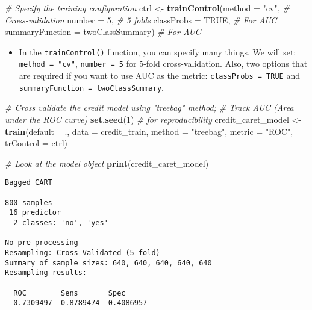 \documentclass[
]{book}
\newenvironment{Shaded}{\begin{snugshade}}{\end{snugshade}}
\newcommand{\CommentTok}[1]{\textcolor[rgb]{0.56,0.35,0.01}{\textit{#1}}}
\newcommand{\DataTypeTok}[1]{\textcolor[rgb]{0.13,0.29,0.53}{#1}}
\newcommand{\DecValTok}[1]{\textcolor[rgb]{0.00,0.00,0.81}{#1}}
\newcommand{\KeywordTok}[1]{\textcolor[rgb]{0.13,0.29,0.53}{\textbf{#1}}}
\newcommand{\NormalTok}[1]{#1}
\newcommand{\OperatorTok}[1]{\textcolor[rgb]{0.81,0.36,0.00}{\textbf{#1}}}
\newcommand{\OtherTok}[1]{\textcolor[rgb]{0.56,0.35,0.01}{#1}}
\newcommand{\StringTok}[1]{\textcolor[rgb]{0.31,0.60,0.02}{#1}}
\providecommand{\tightlist}{%
  \setlength{\itemsep}{0pt}\setlength{\parskip}{0pt}}
\begin{document}
\begin{Shaded}
\begin{Highlighting}[]
\CommentTok{# Specify the training configuration}
\NormalTok{ctrl <-}\StringTok{ }\KeywordTok{trainControl}\NormalTok{(}\DataTypeTok{method =} \StringTok{"cv"}\NormalTok{,     }\CommentTok{# Cross-validation}
                     \DataTypeTok{number =} \DecValTok{5}\NormalTok{,      }\CommentTok{# 5 folds}
                     \DataTypeTok{classProbs =} \OtherTok{TRUE}\NormalTok{,                  }\CommentTok{# For AUC}
                     \DataTypeTok{summaryFunction =}\NormalTok{ twoClassSummary)  }\CommentTok{# For AUC}
\end{Highlighting}
\end{Shaded}

\begin{itemize}
\tightlist
\item
  In the \texttt{trainControl()} function, you can specify many things. We will set: \texttt{method\ =\ "cv"}, \texttt{number\ =\ 5} for 5-fold cross-validation. Also, two options that are required if you want to use AUC as the metric: \texttt{classProbs\ =\ TRUE} and \texttt{summaryFunction\ =\ twoClassSummary}.
\end{itemize}

\begin{Shaded}
\begin{Highlighting}[]
\CommentTok{# Cross validate the credit model using "treebag" method; }
\CommentTok{# Track AUC (Area under the ROC curve)}
\KeywordTok{set.seed}\NormalTok{(}\DecValTok{1}\NormalTok{)  }\CommentTok{# for reproducibility}
\NormalTok{credit_caret_model <-}\StringTok{ }\KeywordTok{train}\NormalTok{(default }\OperatorTok{~}\StringTok{ }\NormalTok{.,}
                            \DataTypeTok{data =}\NormalTok{ credit_train, }
                            \DataTypeTok{method =} \StringTok{"treebag"}\NormalTok{,}
                            \DataTypeTok{metric =} \StringTok{"ROC"}\NormalTok{,}
                            \DataTypeTok{trControl =}\NormalTok{ ctrl)}

\CommentTok{# Look at the model object}
\KeywordTok{print}\NormalTok{(credit_caret_model)}
\end{Highlighting}
\end{Shaded}

\begin{verbatim}
Bagged CART 

800 samples
 16 predictor
  2 classes: 'no', 'yes' 

No pre-processing
Resampling: Cross-Validated (5 fold) 
Summary of sample sizes: 640, 640, 640, 640, 640 
Resampling results:

  ROC        Sens       Spec     
  0.7309497  0.8789474  0.4086957
\end{verbatim}
\end{document}
